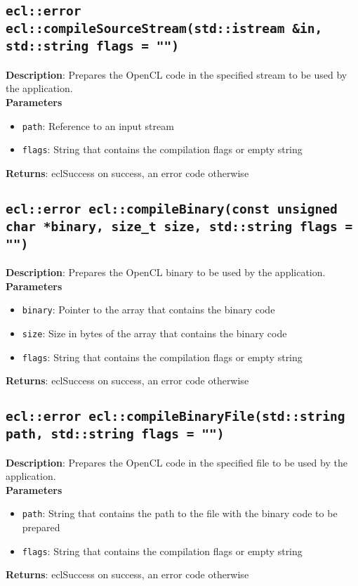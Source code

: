 \subsection{\texttt{ecl::error ecl::compileSourceStream(std::istream \&in, std::string flags = "")}}

\textbf{Description}: Prepares the OpenCL code in the specified stream to be used by the 
application.  \\
\textbf{Parameters}
\begin{itemize}
  \item \texttt{path}: Reference to an input stream
  \item \texttt{flags}: String that contains the compilation flags or empty string
\end{itemize}
\textbf{Returns}: eclSuccess on success, an error code otherwise

\subsection{\texttt{ecl::error ecl::compileBinary(const unsigned char *binary, size\_t size, 
std::string flags = "")}}

\textbf{Description}: Prepares the OpenCL binary to be used by the application.  \\
\textbf{Parameters}
\begin{itemize}
  \item \texttt{binary}: Pointer to the array that contains the binary code
  \item \texttt{size}: Size in bytes of the array that contains the binary code
  \item \texttt{flags}: String that contains the compilation flags or empty string
\end{itemize}
\textbf{Returns}: eclSuccess on success, an error code otherwise

\subsection{\texttt{ecl::error ecl::compileBinaryFile(std::string path, std::string flags = "")}}

\textbf{Description}: Prepares the OpenCL code in the specified file to be used by the application.  \\
\textbf{Parameters}
\begin{itemize}
  \item \texttt{path}: String that contains the path to the file with the binary code to be prepared
  \item \texttt{flags}: String that contains the compilation flags or empty string
\end{itemize}
\textbf{Returns}: eclSuccess on success, an error code otherwise

